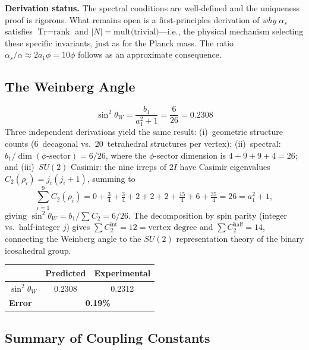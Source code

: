 \documentclass[12pt,a4paper]{article}
\theoremstyle{definition}
\begin{document}
\textbf{Derivation status.} The spectral conditions are well-defined and the uniqueness proof is rigorous. What remains open is a first-principles derivation of \emph{why} $\alpha_s$ satisfies $\text{Tr} = \text{rank}$ and $|N| = \text{mult(trivial)}$---i.e., the physical mechanism selecting these specific invariants, just as for the Planck mass. The ratio $\alpha_s/\alpha \approx 2a_1\phi = 10\phi$ follows as an approximate consequence.

\subsection{The Weinberg Angle}

\begin{equation}
\boxed{\sin^2\theta_W = \frac{b_1}{a_1^2 + 1} = \frac{6}{26} = 0.2308}
\label{eq:weinberg}
\end{equation}
Three independent derivations yield the same result: (i)~geometric structure counts (6~decagonal vs.\ 20~tetrahedral structures per vertex); (ii)~spectral: $b_1 / \dim(\phi\text{-sector}) = 6/26$, where the $\phi$-sector dimension is $4 + 9 + 9 + 4 = 26$; and (iii)~$SU(2)$ Casimir: the nine irreps of $2I$ have Casimir eigenvalues $C_2(\rho_i) = j_i(j_i+1)$, summing to
\begin{equation}
\sum_{i=1}^{9} C_2(\rho_i) = 0 + \tfrac{3}{4} + \tfrac{3}{4} + 2 + 2 + 2 + \tfrac{15}{4} + 6 + \tfrac{35}{4} = 26 = a_1^2 + 1,
\label{eq:casimir_sum}
\end{equation}
giving $\sin^2\theta_W = b_1 / \sum C_2 = 6/26$.  The decomposition by spin parity (integer vs.\ half-integer $j$) gives $\sum C_2^{\text{int}} = 12 = \text{vertex degree}$ and $\sum C_2^{\text{half}} = 14$, connecting the Weinberg angle to the $SU(2)$ representation theory of the binary icosahedral group.

\begin{center}
\begin{tabular}{lcc}
\toprule
& \textbf{Predicted} & \textbf{Experimental} \\
\midrule
$\sin^2\theta_W$ & 0.2308 & 0.2312 \\
\textbf{Error} & \multicolumn{2}{c}{\textbf{0.19\%}} \\
\bottomrule
\end{tabular}
\end{center}

\subsection{Summary of Coupling Constants}
\end{document}
